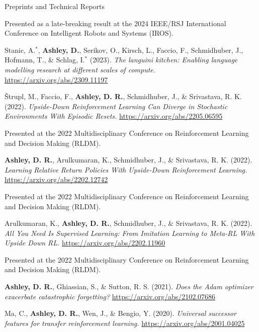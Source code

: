 \documentclass{cv}
\begin{document}
\begin{rSection}{Preprints and Technical Reports}
\begin{rPublications}
        \vspace{-0.4em}
        Presented as a late-breaking result at the 2024 IEEE/RSJ International Conference on Intelligent Robots and Systems (IROS).
    \item
        Stanic, A.$^*$, \textbf{Ashley, D.}, Serikov, O., Kirsch, L., Faccio, F., Schmidhuber, J., Hofmann, T., \& Schlag, I.$^*$
        (2023).
        \textit{The languini kitchen: Enabling language modelling research at different scales of compute.}
        \url{https://arxiv.org/abs/2309.11197}
    \item
        {\v{S}}trupl, M., Faccio, F., \textbf{Ashley, D. R.}, Schmidhuber, J., \& Srivastava, R. K.
        (2022).
        \textit{Upside-Down Reinforcement Learning Can Diverge in Stochastic Environments With Episodic Resets.}
        \url{https://arxiv.org/abs/2205.06595}

        \vspace{-0.4em}
        Presented at the 2022 Multidisciplinary Conference on Reinforcement Learning and Decision Making (RLDM).
    \item
        \textbf{Ashley, D. R.}, Arulkumaran, K., Schmidhuber, J., \& Srivastava, R. K.
        (2022).
        \textit{Learning Relative Return Policies With Upside-Down Reinforcement Learning.}
        \url{https://arxiv.org/abs/2202.12742}

        \vspace{-0.4em}
        Presented at the 2022 Multidisciplinary Conference on Reinforcement Learning and Decision Making (RLDM).
    \item
        Arulkumaran, K., \textbf{Ashley, D. R.}, Schmidhuber, J., \& Srivastava, R. K.
        (2022).
        \textit{All You Need Is Supervised Learning: From Imitation Learning to Meta-RL With Upside Down RL.}
        \url{https://arxiv.org/abs/2202.11960}

        \vspace{-0.4em}
        Presented at the 2022 Multidisciplinary Conference on Reinforcement Learning and Decision Making (RLDM).
    \item
        \textbf{Ashley, D. R.}, Ghiassian, S., \& Sutton, R. S.
        (2021).
        \textit{Does the Adam optimizer exacerbate catastrophic forgetting?}
        \url{https://arxiv.org/abs/2102.07686}
    \item
        Ma, C., \textbf{Ashley, D. R.}, Wen, J., \& Bengio, Y.
        (2020).
        \textit{Universal successor features for transfer reinforcement learning.}
        \url{https://arxiv.org/abs/2001.04025}
\end{rPublications}

\end{rSection}
\end{document}
